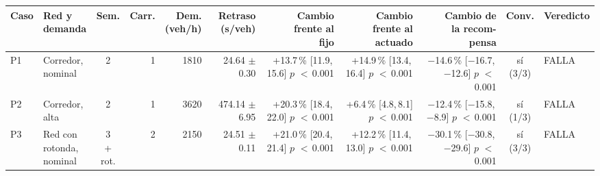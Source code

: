 \begin{table}[H]
\centering
\scriptsize
\setlength{\tabcolsep}{1.5pt}
\begin{tabular}{llcrrrrrrcl}
\toprule
Caso & \makecell[l]{Red y\\demanda} & Sem. & Carr. & \makecell{Dem.\\(veh/h)} & \makecell{Retraso\\(s/veh)} & \makecell{Cambio\\frente al\\fijo} & \makecell{Cambio\\frente al\\actuado} & \makecell{Cambio de\\la recom-\\pensa} & Conv. & Veredicto \\
\midrule
P1 & \makecell[l]{Corredor,\\{}nominal} & 2 & 1 & 1810 & \makecell[r]{24.64\\{}$\pm$ 0.30} & \makecell[r]{+13.7\,\%\\{}[11.9,\,15.6]\\$p$ $<$\,0.001} & \makecell[r]{+14.9\,\%\\{}[13.4,\,16.4]\\$p$ $<$\,0.001} & \makecell[r]{$-$14.6\,\%\\{}[$-$16.7,\,$-$12.6]\\$p$ $<$\,0.001} & \makecell[c]{sí\\{}(3/3)} & FALLA \\
P2 & \makecell[l]{Corredor,\\{}alta} & 2 & 1 & 3620 & \makecell[r]{474.14\\{}$\pm$ 6.95} & \makecell[r]{+20.3\,\%\\{}[18.4,\,22.0]\\$p$ $<$\,0.001} & \makecell[r]{+6.4\,\%\\{}[4.8,\,8.1]\\$p$ $<$\,0.001} & \makecell[r]{$-$12.4\,\%\\{}[$-$15.8,\,$-$8.9]\\$p$ $<$\,0.001} & \makecell[c]{sí\\{}(1/3)} & FALLA \\
P3 & \makecell[l]{Red con\\{}rotonda,\\{}nominal} & \makecell[c]{3\\{}+ rot.} & 2 & 2150 & \makecell[r]{24.51\\{}$\pm$ 0.11} & \makecell[r]{+21.0\,\%\\{}[20.4,\,21.4]\\$p$ $<$\,0.001} & \makecell[r]{+12.2\,\%\\{}[11.4,\,13.0]\\$p$ $<$\,0.001} & \makecell[r]{$-$30.1\,\%\\{}[$-$30.8,\,$-$29.6]\\$p$ $<$\,0.001} & \makecell[c]{sí\\{}(3/3)} & FALLA \\

\end{tabular}
\end{table}
